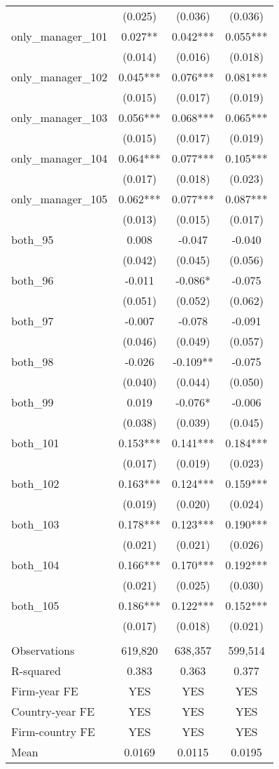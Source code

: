 \begin{tabular}{lccc}
 & (0.025) & (0.036) & (0.036) \\
only\_manager\_101 & 0.027** & 0.042*** & 0.055*** \\
 & (0.014) & (0.016) & (0.018) \\
only\_manager\_102 & 0.045*** & 0.076*** & 0.081*** \\
 & (0.015) & (0.017) & (0.019) \\
only\_manager\_103 & 0.056*** & 0.068*** & 0.065*** \\
 & (0.015) & (0.017) & (0.019) \\
only\_manager\_104 & 0.064*** & 0.077*** & 0.105*** \\
 & (0.017) & (0.018) & (0.023) \\
only\_manager\_105 & 0.062*** & 0.077*** & 0.087*** \\
 & (0.013) & (0.015) & (0.017) \\
both\_95 & 0.008 & -0.047 & -0.040 \\
 & (0.042) & (0.045) & (0.056) \\
both\_96 & -0.011 & -0.086* & -0.075 \\
 & (0.051) & (0.052) & (0.062) \\
both\_97 & -0.007 & -0.078 & -0.091 \\
 & (0.046) & (0.049) & (0.057) \\
both\_98 & -0.026 & -0.109** & -0.075 \\
 & (0.040) & (0.044) & (0.050) \\
both\_99 & 0.019 & -0.076* & -0.006 \\
 & (0.038) & (0.039) & (0.045) \\
both\_101 & 0.153*** & 0.141*** & 0.184*** \\
 & (0.017) & (0.019) & (0.023) \\
both\_102 & 0.163*** & 0.124*** & 0.159*** \\
 & (0.019) & (0.020) & (0.024) \\
both\_103 & 0.178*** & 0.123*** & 0.190*** \\
 & (0.021) & (0.021) & (0.026) \\
both\_104 & 0.166*** & 0.170*** & 0.192*** \\
 & (0.021) & (0.025) & (0.030) \\
both\_105 & 0.186*** & 0.122*** & 0.152*** \\
 & (0.017) & (0.018) & (0.021) \\
 &  &  &  \\
Observations & 619,820 & 638,357 & 599,514 \\
R-squared & 0.383 & 0.363 & 0.377 \\
Firm-year FE & YES & YES & YES \\
Country-year FE & YES & YES & YES \\
Firm-country FE & YES & YES & YES \\
 Mean & 0.0169 & 0.0115 & 0.0195 \\ \hline
\end{tabular}

